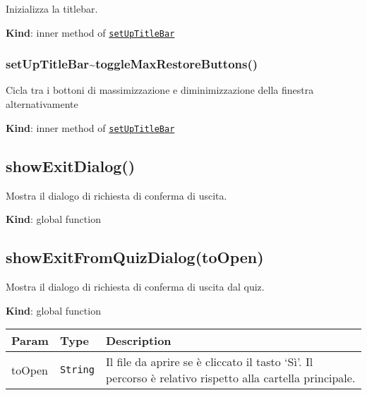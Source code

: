 Inizializza la titlebar.

\textbf{Kind}: inner method of
\protect\hyperlink{setUpTitleBar}{\texttt{setUpTitleBar}}\\
\protect\hypertarget{setUpTitleBar..toggleMaxRestoreButtons}{}{}

\hypertarget{setuptitlebartogglemaxrestorebuttons}{%
\subsubsection{setUpTitleBar\textasciitilde{}toggleMaxRestoreButtons()}\label{setuptitlebartogglemaxrestorebuttons}}

Cicla tra i bottoni di massimizzazione e diminimizzazione della finestra
alternativamente

\textbf{Kind}: inner method of
\protect\hyperlink{setUpTitleBar}{\texttt{setUpTitleBar}}\\
\protect\hypertarget{showExitDialog}{}{}

\hypertarget{showexitdialog}{%
\subsection{showExitDialog()}\label{showexitdialog}}

Mostra il dialogo di richiesta di conferma di uscita.

\textbf{Kind}: global function\\
\protect\hypertarget{showExitFromQuizDialog}{}{}

\hypertarget{showexitfromquizdialogtoopen}{%
\subsection{showExitFromQuizDialog(toOpen)}\label{showexitfromquizdialogtoopen}}

Mostra il dialogo di richiesta di conferma di uscita dal quiz.

\textbf{Kind}: global function

\begin{tabularx}{\textwidth}{XXX}
\toprule
\begin{minipage}[b]{0.30\columnwidth}\raggedright
Param\strut
\end{minipage} & \begin{minipage}[b]{0.30\columnwidth}\raggedright
Type\strut
\end{minipage} & \begin{minipage}[b]{0.30\columnwidth}\raggedright
Description\strut
\end{minipage}\tabularnewline
\midrule
\endhead
\begin{minipage}[t]{0.30\columnwidth}\raggedright
toOpen\strut
\end{minipage} & \begin{minipage}[t]{0.30\columnwidth}\raggedright
\texttt{String}\strut
\end{minipage} & \begin{minipage}[t]{0.30\columnwidth}\raggedright
Il file da aprire se è cliccato il tasto `Sì'. Il percorso è relativo
rispetto alla cartella principale.\strut
\end{minipage}\tabularnewline
\bottomrule
\end{tabularx}

